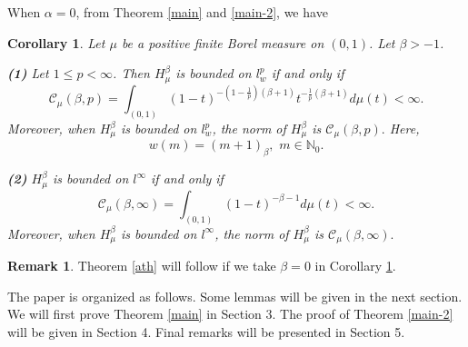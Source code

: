\documentclass[10pt]{amsart}
\newtheorem{corollary}[theorem]{Corollary}
\theoremstyle{definition}
\newtheorem{remark}[theorem]{Remark}
\theoremstyle{question}
\numberwithin{equation}{section}
\begin{document}
When $\alpha=0$, from Theorem \ref{main} and \ref{main-2},  we have
\begin{corollary}\label{cor}
Let $\mu$ be a positive finite Borel measure on $(0,1)$. Let $\beta>-1$.

{\bf(1)} Let $1\leq p<\infty$. Then $H_{\mu}^{\beta}$ is bounded on $l_{w}^{p}$ if and only if 
$$\mathcal{C}_{\mu}(\beta, p)=\int_{(0,1)} (1-t)^{-(1-\frac{1}{p})(\beta+1)} t^{-\frac{1}{p}(\beta+1)}d\mu(t)<\infty.$$
Moreover, when $H_{\mu}^{\beta}$ is bounded on $l_{w}^{p}$, the norm of $H_{\mu}^{\beta}$ is $\mathcal{C}_{\mu}({\beta,p}).$ Here, $$w(m)=(m+1)_{\beta},\,\, m\in \mathbb{N}_0.$$

{\bf(2)} $H_{\mu}^{\beta}$ is bounded on $l^{\infty}$ if and only if 
$$\mathcal{C}_{\mu}(\beta, \infty)=\int_{(0,1)} (1-t)^{-\beta-1}d\mu(t)<\infty.$$
Moreover, when $H_{\mu}^{\beta}$ is bounded on $l^{\infty}$, the norm of $H_{\mu}^{\beta}$ is $\mathcal{C}_{\mu}({\beta,\infty}).$

\end{corollary}
\begin{remark}
Theorem \ref{ath} will follow if we take $\beta=0$ in Corollary \ref{cor}.  
\end{remark}

The paper is organized as follows. Some lemmas will be given in the next section.  We will first prove Theorem \ref{main} in Section 3. The proof of Theorem \ref{main-2} will be given in Section 4.  Final remarks will be presented in Section 5.
\end{document}

